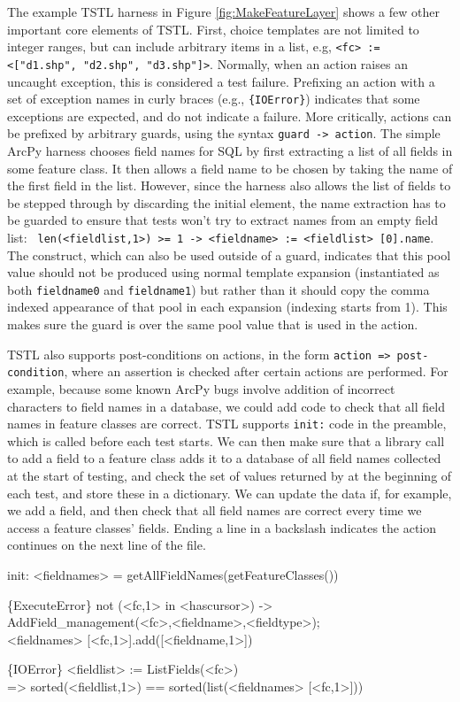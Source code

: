 The example TSTL harness in Figure \ref{fig:MakeFeatureLayer} shows a
few other important core elements of TSTL.  First, choice templates
are not limited to integer ranges, but can include arbitrary items in
a list, e.g, {\tt <fc> := <["d1.shp", "d2.shp", "d3.shp"]>}.
Normally, when an action raises an uncaught exception, this is
considered a test failure.  Prefixing an action with a set of
exception names in curly braces (e.g., {\tt \{IOError\}}) indicates
that some exceptions are expected, and do not indicate a failure.
More critically, actions can be prefixed by arbitrary guards, using
the syntax {\tt guard -> action}.  The simple ArcPy harness chooses
field names for SQL by first extracting a list of all fields in some
feature class.  It then allows a field name to be chosen by taking the
name of the first field in the list.  However, since the harness also
allows the list of fields to be stepped through by discarding the
initial element, the name extraction has to be guarded to ensure that
tests won't try to extract names from an empty field list:  {\tt
  len(<fieldlist,1>) >= 1 -> <fieldname> := <fieldlist> [0].name}.
The {\tt <fieldlist,1>} construct, which can also be used outside of a
guard, indicates that this pool value should not be produced using
normal template expansion (instantiated as both {\tt fieldname0} and
{\tt fieldname1}) but rather than it should copy the comma indexed
appearance of that pool in each expansion (indexing starts from 1).  This makes sure the guard
is over the same pool value that is used in the action.

TSTL also supports post-conditions on actions, in the form {\tt action
  => post-condition}, where an assertion is
checked after certain actions are performed.  For example, because
some known ArcPy bugs involve addition of incorrect characters to
field names in a database, we could add code to check that all field
names in feature classes are correct.  TSTL supports {\tt init:} code
in the preamble, which is called before each test starts.  We can then
make sure that a library call to add a field to a feature class adds
it to a database of all field names collected at the start of testing,
and check the set of values returned by 
at the beginning of each test, and store these in a dictionary.  We
can update the data if, for example, we add a field, and then check
that all field names are correct every time we access a feature
classes' fields.  Ending a line in a backslash indicates the action
continues on the next line of the file.

{\scriptsize
\begin{code}
init: <fieldnames> = getAllFieldNames(getFeatureClasses())

\{ExecuteError\} not (<fc,1> in <hascursor>) -> \\
   AddField\_management(<fc>,<fieldname>,<fieldtype>); \\
   <fieldnames> [<fc,1>].add([<fieldname,1>])

\{IOError\} <fieldlist> := ListFields(<fc>) \\
  => sorted(<fieldlist,1>) == sorted(list(<fieldnames> [<fc,1>]))
\end{code}
}

